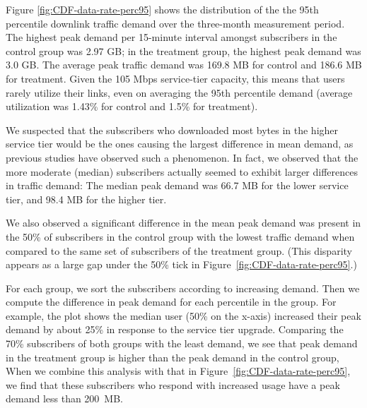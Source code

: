 Figure \ref{fig:CDF-data-rate-perc95} shows the distribution of the the
95th percentile downlink traffic demand over the three-month measurement
period. The highest peak demand per 15-minute interval amongst
subscribers in the control group was 2.97 GB; in the treatment group,
the highest peak demand was 3.0 GB.
The average peak traffic demand was 169.8 MB for control and
186.6 MB for treatment. Given the 105 Mbps service-tier capacity,
this means that users rarely utilize their links,
even on averaging the 95th percentile demand (average utilization was 
1.43\% for control and 1.5\% for treatment).

We suspected that the subscribers who downloaded most bytes in the
higher service tier would be the ones causing the largest difference in
mean demand, as previous studies have observed such a phenomenon. In
fact, we observed that the more moderate (median) subscribers actually seemed
to exhibit larger differences in traffic demand: The median peak demand
was 66.7 MB for the lower service tier, and 98.4 MB for the higher
tier.  

We also observed a significant difference in the mean peak
demand was present in the 50\% of subscribers in the control group
with the lowest traffic demand when compared to the same set of
subscribers of the treatment group. (This disparity appears as a large
gap under the 50\% tick in Figure~\ref{fig:CDF-data-rate-perc95}.)


For each group, we sort the subscribers according to
increasing demand.  Then we compute the difference in peak demand for
each percentile in the group.  For example, the plot shows the median
user (50\% on the x-axis) increased their peak demand by about 25\% in
response to the service tier upgrade.  Comparing the 70\% subscribers of
both groups with the least demand, we see that peak demand in the
treatment group is higher than the peak demand in the control group,
When we combine this analysis with that in
Figure~\ref{fig:CDF-data-rate-perc95}, we find that these subscribers
who respond with increased usage have a peak demand less than 200~MB.


